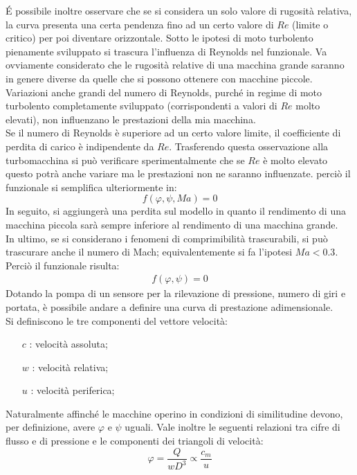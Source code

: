 \'E possibile inoltre osservare che se si considera un solo valore di rugosità relativa, la curva presenta una certa pendenza fino ad un certo valore di $Re$ (limite o critico) per poi diventare orizzontale. Sotto le ipotesi di moto turbolento pienamente sviluppato si trascura l’influenza di Reynolds nel funzionale. Va ovviamente considerato che le rugosità relative di una macchina grande saranno in genere diverse da quelle che si possono ottenere con macchine piccole. Variazioni anche grandi del numero di Reynolds, purché in regime di moto turbolento completamente sviluppato (corrispondenti a valori di $Re$ molto elevati), non influenzano le prestazioni della mia macchina.\\
Se il numero di Reynolds è superiore ad un certo valore limite, il coefficiente di perdita di carico è indipendente da $Re$. Trasferendo questa osservazione alla turbomacchina si può verificare sperimentalmente che se $Re$ è molto elevato questo potrà anche variare ma le prestazioni non ne saranno influenzate. perciò il funzionale si semplifica ulteriormente in:
\begin{equation}
f(\varphi,\psi,Ma)=0
\end{equation}
In seguito, si aggiungerà una perdita sul modello in quanto il rendimento di una macchina piccola sarà sempre inferiore al rendimento di una macchina grande.\\
In ultimo, se si considerano i fenomeni di comprimibilità trascurabili, si può trascurare anche il numero di Mach; equivalentemente si fa l'ipotesi $Ma<0.3$. Perciò il funzionale risulta:
\begin{align*}
f(\varphi,\psi)=0
\end{align*}
Dotando la pompa di un sensore per la rilevazione di pressione, numero di giri e portata, è possibile andare a definire una curva di prestazione adimensionale.\\
Si definiscono le tre componenti del vettore velocità:
\begin{itemize}
\item[$c$]: velocità assoluta;
\item[$w$]: velocità relativa;
\item[$u$]: velocità periferica;
\end{itemize}
Naturalmente affinché le macchine operino in condizioni di similitudine devono, per definizione, avere $\varphi$ e $\psi$ uguali. Vale inoltre le seguenti relazioni tra cifre di flusso e di pressione e le componenti dei triangoli di velocità:
\begin{equation}
\varphi=\frac{Q}{w D^3} \propto \frac{c_m}{u}
\end{equation}
